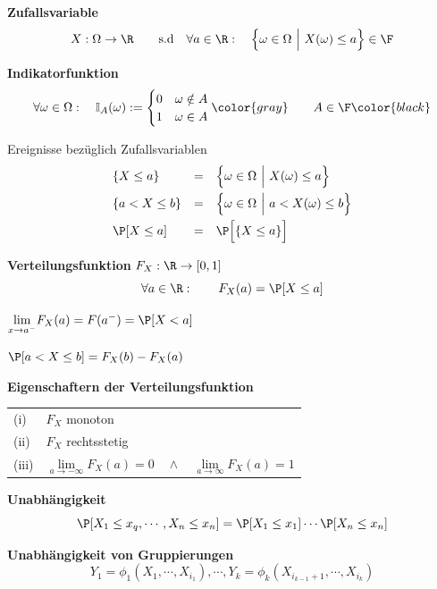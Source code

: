  \textbf{Zufallsvariable}
$$
    X: \Omega \to \R \qquad \text{s.d} \quad \forall a \in \R:\quad \Bigl\{ \omega \in \Omega\ \Big|\ X(\omega)\leq a \Bigr\} \in \F
$$

\footnotesize
{} \textbf{Indikatorfunktion}
$$
    \forall \omega \in \Omega:\quad \mathbb{I}_A(\omega) := \begin{cases}
        0 & \omega \notin A \\
        1 & \omega \in A
    \end{cases}
    \color{gray}
    \qquad A \in \F
    \color{black}
$$
\normalsize

\notation Ereignisse bezüglich Zufallsvariablen
\begin{align*}
    & \{ X \leq a \}      &=\quad& \Bigl\{ \omega \in \Omega \ \Big|\ X(\omega) \leq a \Bigr\} \\
    & \{ a < X \leq b \}  &=\quad& \Bigl\{ \omega \in \Omega \ \Big|\ a < X(\omega) \leq b \Bigr\} \\
    & \P[X \leq a]        &=\quad& \P\Bigl[\{ X \leq a \}\Bigr]
\end{align*}

 \textbf{Verteilungsfunktion} $F_X: \R \to [0,1]$
$$
    \forall a \in \R:\qquad F_X(a) = \P[X \leq a]
$$

{\scriptsize
    \notation $\underset{x \to a^-}{\lim}F_X(a) = F(a^-) = \P[X < a]$

    \lemma $\P[a < X \leq b] = F_X(b) - F_X(a)$
}

\theorem \textbf{Eigenschaftern der Verteilungsfunktion}

\begin{tabular}{ll}
    (i)     & $F_X$ monoton \\
    (ii)    & $F_X$ rechtsstetig \\
    (iii)   & $\underset{a \to -\infty}{\lim} F_X(a) = 0 \quad\land\quad \underset{a \to \infty}{\lim}F_X(a)=1$
\end{tabular}

 \textbf{Unabhängigkeit}\\
$$
    \P[X_1 \leq x_q,\cdots, X_n \leq x_n] = \P[X_1 \leq x_1] \cdots \P[X_n \leq x_n]
$$

\newpage

\theorem \textbf{Unabhängigkeit von Gruppierungen}\\
$$
    Y_1 = \phi_1(X_1,\cdots,X_{i_1}), \cdots , Y_k = \phi_k(X_{i_{k-1}+1},\cdots,X_{i_k})
$$

